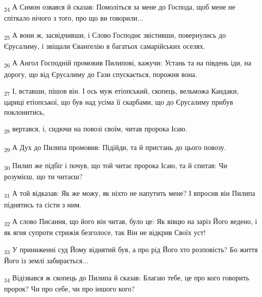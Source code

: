 \begin{tcolorbox}
\textsubscript{24} А Симон озвався й сказав: Помоліться за мене до Господа, щоб мене не спіткало нічого з того, про що ви говорили...
\end{tcolorbox}
\begin{tcolorbox}
\textsubscript{25} А вони ж, засвідчивши, і Слово Господнє звістивши, повернулись до Єрусалиму, і звіщали Євангелію в багатьох самарійських оселях.
\end{tcolorbox}
\begin{tcolorbox}
\textsubscript{26} А Ангол Господній промовив Пилипові, кажучи: Устань та на південь іди, на дорогу, що від Єрусалиму до Гази спускається, порожня вона.
\end{tcolorbox}
\begin{tcolorbox}
\textsubscript{27} І, вставши, пішов він. І ось муж етіопський, скопець, вельможа Кандаки, цариці етіопської, що був над усіма її скарбами, що до Єрусалиму прибув поклонитись,
\end{tcolorbox}
\begin{tcolorbox}
\textsubscript{28} вертався, і, сидючи на повозі своїм, читав пророка Ісаю.
\end{tcolorbox}
\begin{tcolorbox}
\textsubscript{29} А Дух до Пилипа промовив: Підійди, та й пристань до цього повозу.
\end{tcolorbox}
\begin{tcolorbox}
\textsubscript{30} Пилип же підбіг і почув, що той читає пророка Ісаю, та й спитав: Чи розумієш, що ти читаєш?
\end{tcolorbox}
\begin{tcolorbox}
\textsubscript{31} А той відказав: Як же можу, як ніхто не напутить мене? І впросив він Пилипа піднятись та сісти з ним.
\end{tcolorbox}
\begin{tcolorbox}
\textsubscript{32} А слово Писання, що його він читав, було це: Як вівцю на заріз Його ведено, і як ягня супроти стрижія безголосе, так Він не відкрив Своїх уст!
\end{tcolorbox}
\begin{tcolorbox}
\textsubscript{33} У приниженні суд Йому віднятий був, а про рід Його хто розповість? Бо життя Його із землі забирається...
\end{tcolorbox}
\begin{tcolorbox}
\textsubscript{34} Відізвався ж скопець до Пилипа й сказав: Благаю тебе, це про кого говорить пророк? Чи про себе, чи про іншого кого?
\end{tcolorbox}
